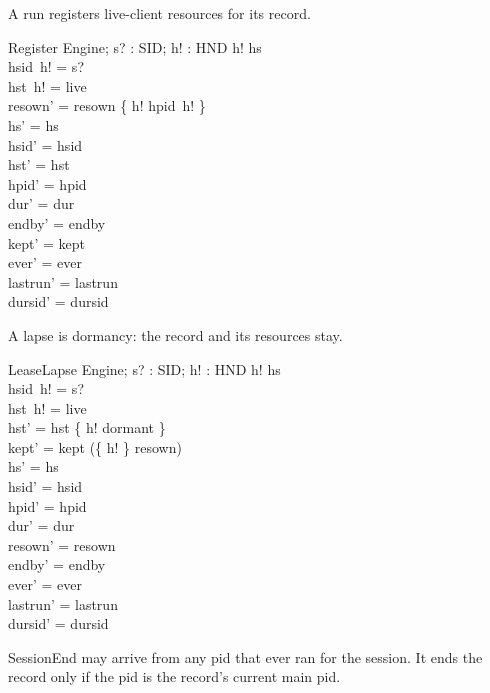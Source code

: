 \documentclass[a4paper,10pt,fleqn]{article}
\begin{document}
A run registers live-client resources for its record.

\begin{schema}{Register}
  \Delta Engine; s? : SID; h! : HND
\where
  h! \in hs \\
  hsid~h! = s? \\
  hst~h! = live \\
  resown' = resown \oplus \{ h! \mapsto hpid~h! \} \\
  hs' = hs \\
  hsid' = hsid \\
  hst' = hst \\
  hpid' = hpid \\
  dur' = dur \\
  endby' = endby \\
  kept' = kept \\
  ever' = ever \\
  lastrun' = lastrun \\
  dursid' = dursid
\end{schema}

A lapse is dormancy: the record and its resources stay.

\begin{schema}{LeaseLapse}
  \Delta Engine; s? : SID; h! : HND
\where
  h! \in hs \\
  hsid~h! = s? \\
  hst~h! = live \\
  hst' = hst \oplus \{ h! \mapsto dormant \} \\
  kept' = kept \cup (\{ h! \} \cap \dom resown) \\
  hs' = hs \\
  hsid' = hsid \\
  hpid' = hpid \\
  dur' = dur \\
  resown' = resown \\
  endby' = endby \\
  ever' = ever \\
  lastrun' = lastrun \\
  dursid' = dursid
\end{schema}

SessionEnd may arrive from any pid that ever ran for the session.  It ends
the record only if the pid is the record's current main pid.
\end{document}
